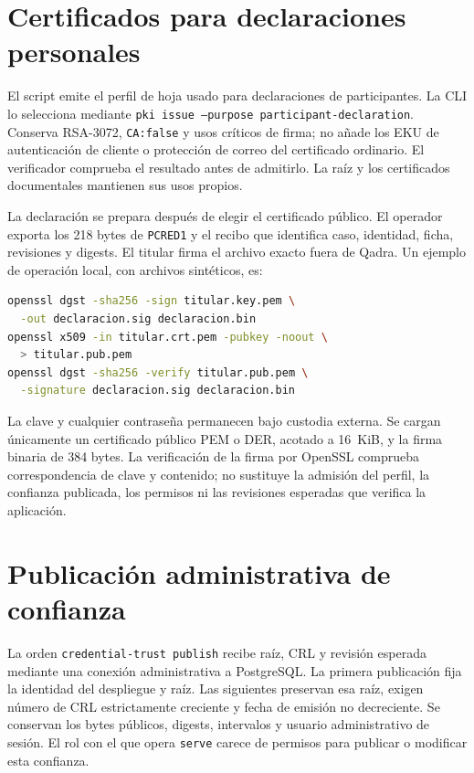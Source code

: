 \section{Certificados para declaraciones personales}\label{sec:pki-declaraciones}

{\raggedright El script  emite el perfil de hoja usado para declaraciones de participantes. La CLI lo selecciona mediante \texttt{pki issue --purpose participant-declaration}. Conserva RSA-3072, \texttt{CA:false} y usos críticos de firma; no añade los EKU de autenticación de cliente o protección de correo del certificado ordinario. El verificador comprueba el resultado antes de admitirlo. La raíz y los certificados documentales mantienen sus usos propios.\par}

La declaración se prepara después de elegir el certificado público. El operador exporta los 218 bytes de \texttt{PCRED1} y el recibo que identifica caso, identidad, ficha, revisiones y digests. El titular firma el archivo exacto fuera de Qadra. Un ejemplo de operación local, con archivos sintéticos, es:

\begin{lstlisting}[language=bash, caption={Firma separada de una declaración exacta con la clave del titular.}, label={lst:pki-declaracion}]
openssl dgst -sha256 -sign titular.key.pem \
  -out declaracion.sig declaracion.bin
openssl x509 -in titular.crt.pem -pubkey -noout \
  > titular.pub.pem
openssl dgst -sha256 -verify titular.pub.pem \
  -signature declaracion.sig declaracion.bin
\end{lstlisting}

La clave y cualquier contraseña permanecen bajo custodia externa. Se cargan únicamente un certificado público PEM o DER, acotado a 16~KiB, y la firma binaria de 384 bytes. La verificación de la firma por OpenSSL comprueba correspondencia de clave y contenido; no sustituye la admisión del perfil, la confianza publicada, los permisos ni las revisiones esperadas que verifica la aplicación.

\section{Publicación administrativa de confianza}\label{sec:pki-confianza-publicada}

La orden \texttt{credential-trust publish} recibe raíz, CRL y revisión esperada mediante una conexión administrativa a PostgreSQL. La primera publicación fija la identidad del despliegue y raíz. Las siguientes preservan esa raíz, exigen número de CRL estrictamente creciente y fecha de emisión no decreciente. Se conservan los bytes públicos, digests, intervalos y usuario administrativo de sesión. El rol con el que opera \texttt{serve} carece de permisos para publicar o modificar esta confianza.

